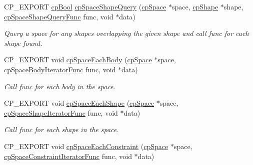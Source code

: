 \begin{DoxyCompactItemize}
\mbox{\label{group__cp_space_ga8a87a09145f33a72404c77cce54e4778}} 
C\+P\+\_\+\+E\+X\+P\+O\+RT \mbox{\hyperlink{group__basic_types_gabc5e752c48f3449ca26ef413ecbd647e}{cp\+Bool}} \mbox{\hyperlink{group__cp_space_ga8a87a09145f33a72404c77cce54e4778}{cp\+Space\+Shape\+Query}} (\mbox{\hyperlink{structcp_space}{cp\+Space}} $\ast$space, \mbox{\hyperlink{structcp_shape}{cp\+Shape}} $\ast$shape, \mbox{\hyperlink{group__cp_space_gab124952dd71dea36688f6ff6ff8bdcb2}{cp\+Space\+Shape\+Query\+Func}} func, void $\ast$data)
\begin{DoxyCompactList}\small\item\em Query a space for any shapes overlapping the given shape and call {\ttfamily func} for each shape found. \end{DoxyCompactList}\item 
\mbox{\label{group__cp_space_ga8119f11a4c6a44d82fb15a5873c42607}} 
C\+P\+\_\+\+E\+X\+P\+O\+RT void \mbox{\hyperlink{group__cp_space_ga8119f11a4c6a44d82fb15a5873c42607}{cp\+Space\+Each\+Body}} (\mbox{\hyperlink{structcp_space}{cp\+Space}} $\ast$space, \mbox{\hyperlink{group__cp_space_ga2870b1128c5bfe79cb261d269abdea64}{cp\+Space\+Body\+Iterator\+Func}} func, void $\ast$data)
\begin{DoxyCompactList}\small\item\em Call {\ttfamily func} for each body in the space. \end{DoxyCompactList}\item 
\mbox{\label{group__cp_space_gab586704d72681645d9e91d42e97f96ff}} 
C\+P\+\_\+\+E\+X\+P\+O\+RT void \mbox{\hyperlink{group__cp_space_gab586704d72681645d9e91d42e97f96ff}{cp\+Space\+Each\+Shape}} (\mbox{\hyperlink{structcp_space}{cp\+Space}} $\ast$space, \mbox{\hyperlink{group__cp_space_gafae017c9a8a7c082032035bf165e4ec9}{cp\+Space\+Shape\+Iterator\+Func}} func, void $\ast$data)
\begin{DoxyCompactList}\small\item\em Call {\ttfamily func} for each shape in the space. \end{DoxyCompactList}\item 
\mbox{\label{group__cp_space_ga0f494c054cb89a0a842ef1a0e344ce58}} 
C\+P\+\_\+\+E\+X\+P\+O\+RT void \mbox{\hyperlink{group__cp_space_ga0f494c054cb89a0a842ef1a0e344ce58}{cp\+Space\+Each\+Constraint}} (\mbox{\hyperlink{structcp_space}{cp\+Space}} $\ast$space, \mbox{\hyperlink{group__cp_space_ga0bf20ed2411342352dc43b71c60649c1}{cp\+Space\+Constraint\+Iterator\+Func}} func, void $\ast$data)

\end{DoxyCompactItemize}
